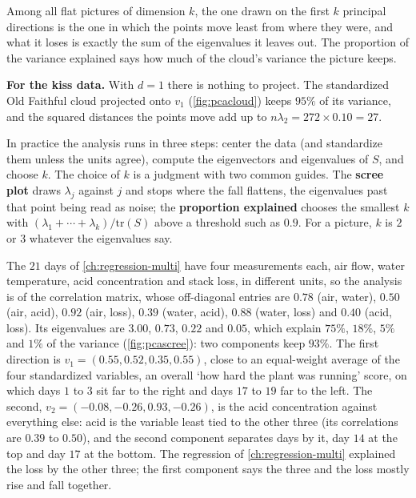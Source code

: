 \begin{inwords}
Among all flat pictures of dimension $k$, the one drawn on the first $k$ principal directions is the one in which the points move least from where they were, and what it loses is exactly the sum of the eigenvalues it leaves out. The proportion of the variance explained says how much of the cloud's variance the picture keeps.

\textbf{For the kiss data.} With $d = 1$ there is nothing to project. The standardized Old Faithful cloud projected onto $v_1$ (\cref{fig:pcacloud}) keeps $95\%$ of its variance, and the squared distances the points move add up to $n\lambda_2 = 272 \times 0.10 = 27$.
\end{inwords}

In practice the analysis runs in three steps: center the data (and standardize them unless the units agree), compute the eigenvectors and eigenvalues of $S$, and choose $k$.
The choice of $k$ is a judgment with two common guides.
The \textbf{scree plot} draws $\lambda_j$ against $j$ and stops where the fall flattens, the eigenvalues past that point being read as noise; the \textbf{proportion explained} chooses the smallest $k$ with $(\lambda_1 + \cdots + \lambda_k)/\mathrm{tr}(S)$ above a threshold such as $0.9$.
For a picture, $k$ is $2$ or $3$ whatever the eigenvalues say.

\begin{worked}
The $21$ days of \cref{ch:regression-multi} have four measurements each, air flow, water temperature, acid concentration and stack loss, in different units, so the analysis is of the correlation matrix, whose off-diagonal entries are $0.78$ (air, water), $0.50$ (air, acid), $0.92$ (air, loss), $0.39$ (water, acid), $0.88$ (water, loss) and $0.40$ (acid, loss). Its eigenvalues are $3.00$, $0.73$, $0.22$ and $0.05$, which explain $75\%$, $18\%$, $5\%$ and $1\%$ of the variance (\cref{fig:pcascree}): two components keep $93\%$. The first direction is $v_1 = (0.55, 0.52, 0.35, 0.55)$, close to an equal-weight average of the four standardized variables, an overall `how hard the plant was running' score, on which days $1$ to $3$ sit far to the right and days $17$ to $19$ far to the left. The second, $v_2 = (-0.08, -0.26, 0.93, -0.26)$, is the acid concentration against everything else: acid is the variable least tied to the other three (its correlations are $0.39$ to $0.50$), and the second component separates days by it, day $14$ at the top and day $17$ at the bottom. The regression of \cref{ch:regression-multi} explained the loss by the other three; the first component says the three and the loss mostly rise and fall together.
\end{worked}

